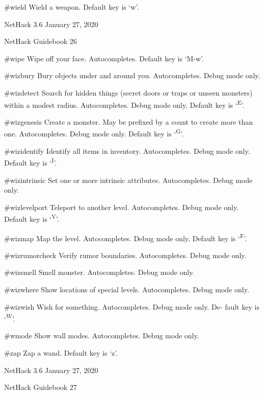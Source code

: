 \documentclass[11pt]{article}
\begin{document}
\#wield
   Wield a weapon. Default key is `w'.




NetHack 3.6                   January 27, 2020





NetHack Guidebook                       26



\#wipe
   Wipe off your face. Autocompletes. Default key is `M-w'.

\#wizbury
   Bury objects under and around you. Autocompletes. Debug
   mode only.

\#wizdetect
   Search for hidden things (secret doors or traps or unseen
   monsters) within a modest radius. Autocompletes. Debug
   mode only. Default key is `\textsuperscript{E}'.

\#wizgenesis
   Create a monster. May be prefixed by a count to create more
   than one. Autocompletes. Debug mode only. Default key is
   `\textsuperscript{G}'.

\#wizidentify
   Identify all items in inventory. Autocompletes. Debug mode
   only. Default key is `\textsuperscript{I}'.

\#wizintrinsic
   Set one or more intrinsic attributes. Autocompletes. Debug
   mode only.

\#wizlevelport
   Teleport to another level. Autocompletes. Debug mode only.
   Default key is `\textsuperscript{V}'.

\#wizmap
   Map the level.  Autocompletes. Debug mode only. Default
   key is `\textsuperscript{F}'.

\#wizrumorcheck
   Verify rumor boundaries. Autocompletes. Debug mode only.

\#wizsmell
   Smell monster. Autocompletes. Debug mode only.

\#wizwhere
   Show locations of special levels.  Autocompletes.  Debug
   mode only.

\#wizwish
   Wish for something. Autocompletes. Debug mode only. De-
   fault key is `\textsuperscript{W}'.

\#wmode
   Show wall modes. Autocompletes. Debug mode only.

\#zap
   Zap a wand. Default key is `z'.




NetHack 3.6                   January 27, 2020





NetHack Guidebook                       27
\end{document}
